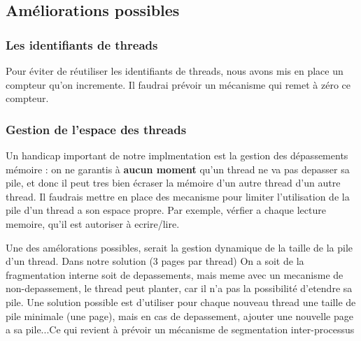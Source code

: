 \documentclass[a4paper,10pt]{article}
\begin{document}
\subsection{Améliorations possibles}

\subsubsection{Les identifiants de threads}

Pour éviter de réutiliser les identifiants de threads, nous avons mis en place
un compteur qu'on incremente. Il faudrai prévoir un mécanisme qui remet à zéro
ce compteur.

\subsubsection{Gestion de l'espace des threads}

Un handicap important de notre implmentation est la gestion des dépassements
mémoire : on ne garantis à \textbf{aucun moment} qu'un thread ne va pas depasser
sa pile, et donc il peut tres bien écraser la mémoire d'un autre thread d'un
autre thread. Il faudrais mettre en place des mecanisme pour limiter
l'utilisation de la pile d'un thread a son espace propre. Par exemple, vérfier a
chaque lecture memoire, qu'il est autoriser à ecrire/lire.

Une des amélorations possibles, serait la gestion dynamique de la taille
de la pile d'un thread. Dans notre solution (3 pages par thread) On a soit de
la fragmentation interne soit de depassements, mais meme avec un mecanisme de
non-depassement, le thread peut planter, car il n'a pas la possibilité
d'etendre sa pile. Une solution possible est d'utiliser pour
chaque nouveau thread une taille de pile minimale (une page), mais en cas de
depassement, ajouter une nouvelle page a sa pile...Ce qui revient à prévoir un
mécanisme de segmentation inter-processus
\end{document}
